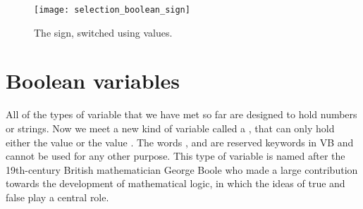 		\begin{figure}[th]
			\centering
			\texttt{[image: selection\_boolean\_sign]}
			\caption{The sign, switched using  values.}
			\label{fig:selection_boolean_sign}
		\end{figure}


	\section{Boolean variables}
		All of the types of variable that we have met so far are designed to hold numbers or strings. Now we meet a new kind of variable called a , that can only hold either the value  or the value . The words ,  and  are reserved keywords in VB and cannot be used for any other purpose. This type of variable is named after the 19th-century British mathematician George Boole who made a large contribution towards the development of mathematical logic, in which the ideas of true and false play a central role.

